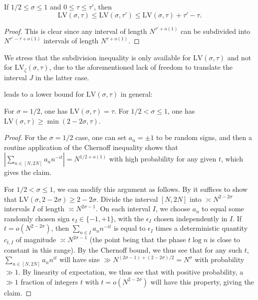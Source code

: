\documentclass[a4paper, 10pt]{amsart}
\newcommand{\LV}{\mathrm{LV}}
\begin{document}
\begin{lemma}\label{hux-sub} If $1/2 \leq \sigma \leq 1$ and $0 \leq \tau \leq \tau'$, then
    $$ \LV(\sigma,\tau) \leq \LV(\sigma,\tau') \leq \LV(\sigma,\tau) + \tau'-\tau.$$
\end{lemma}

\begin{proof} This is clear since any interval of length $N^{\tau'+o(1)}$ can be subdivided into $N^{\tau'-\tau+o(1)}$ intervals of length $N^{\tau+o(1)}$.
\end{proof}

We stress that the subdivision inequality is only available for $\LV(\sigma,\tau)$ and not for $\LV_\zeta(\sigma,\tau)$, due to the aforementioned lack of freedom to translate the interval $J$ in the latter case.

 leads to a lower bound for $\LV(\sigma,\tau)$ in general:

\begin{lemma}\label{lv-lower} For $\sigma=1/2$, one has $\LV(\sigma,\tau)=\tau$.  For $1/2 < \sigma \leq 1$, one has $\LV(\sigma,\tau) \geq \min(2-2\sigma,\tau)$.
\end{lemma}

\begin{proof}  For the $\sigma=1/2$ case, one can set $a_n = \pm 1$ to be random signs, and then a routine application of the Chernoff inequality shows that $\left|\sum_{n \in [N,2N]} a_n n^{-it} \right| = N^{1/2+o(1)}$ with high probability for any given $t$, which gives the claim. 

For $1/2 < \sigma \leq 1$, we can modify this argument as follows.  By  it suffices to show that $\LV(\sigma,2-2\sigma) \geq 2-2\sigma$.  Divide the interval $[N,2N]$ into $\asymp N^{2-2\sigma}$ intervals  $I$ of length $\asymp N^{2\sigma-1}$.  On each interval $I$, we choose $a_n$ to equal some randomly chosen sign $\epsilon_I \in \{-1,+1\}$, with the $\epsilon_I$ chosen independently in $I$.  If $t = o(N^{2-2\sigma})$, then $\sum_{n \in I} a_n n^{-it}$ is equal to $\epsilon_I$ times a deterministic quantity $c_{t,I}$ of magnitude $\asymp N^{2\sigma-1}$ (the point being that the phase $t \log n$ is close to constant in this range).  By the Chernoff bound, we thus see that for any such $t$, $\sum_{n \in [N,2N]} a_n n^{it}$ will have size $\gg N^{(2\sigma-1) + (2-2\sigma)/2} = N^\sigma$ with probability $\gg 1$. By linearity of expectation, we thus see that with positive probability, a $\gg 1$ fraction of integers $t$ with $t = o(N^{2-2\sigma})$ will have this property, giving the claim.
\end{proof}
\end{document}
